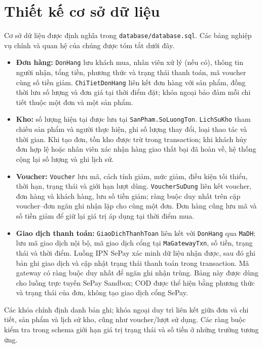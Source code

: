 \section{Thiết kế cơ sở dữ liệu}
Cơ sở dữ liệu được định nghĩa trong \texttt{database/database.sql}. Các bảng nghiệp vụ chính và quan hệ của chúng được tóm tắt dưới đây.

\begin{itemize}
    \item \textbf{Đơn hàng:} \texttt{DonHang} lưu khách mua, nhân viên xử lý (nếu có), thông tin người nhận, tổng tiền, phương thức và trạng thái thanh toán, mã voucher cùng số tiền giảm. \texttt{ChiTietDonHang} liên kết đơn hàng với sản phẩm, đồng thời lưu số lượng và đơn giá tại thời điểm đặt; khóa ngoại bảo đảm mỗi chi tiết thuộc một đơn và một sản phẩm.
    \item \textbf{Kho:} số lượng hiện tại được lưu tại \texttt{SanPham.SoLuongTon}. \texttt{LichSuKho} tham chiếu sản phẩm và người thực hiện, ghi số lượng thay đổi, loại thao tác và thời gian. Khi tạo đơn, tồn kho được trừ trong transaction; khi khách hủy đơn hợp lệ hoặc nhân viên xác nhận hàng giao thất bại đã hoàn về, hệ thống cộng lại số lượng và ghi lịch sử.
    \item \textbf{Voucher:} \texttt{Voucher} lưu mã, cách tính giảm, mức giảm, điều kiện tối thiểu, thời hạn, trạng thái và giới hạn lượt dùng. \texttt{VoucherSuDung} liên kết voucher, đơn hàng và khách hàng, lưu số tiền giảm; ràng buộc duy nhất trên cặp voucher--đơn ngăn ghi nhận lặp cho cùng một đơn. Đơn hàng cũng lưu mã và số tiền giảm để giữ lại giá trị áp dụng tại thời điểm mua.
    \item \textbf{Giao dịch thanh toán:} \texttt{GiaoDichThanhToan} liên kết với \texttt{DonHang} qua \texttt{MaDH}; lưu mã giao dịch nội bộ, mã giao dịch cổng tại \texttt{MaGatewayTxn}, số tiền, trạng thái và thời điểm. Luồng IPN SePay xác minh dữ liệu nhận được, sau đó ghi bản ghi giao dịch và cập nhật trạng thái thanh toán trong transaction. Mã gateway có ràng buộc duy nhất để ngăn ghi nhận trùng. Bảng này được dùng cho luồng trực tuyến SePay Sandbox; COD được thể hiện bằng phương thức và trạng thái của đơn, không tạo giao dịch cổng SePay.
\end{itemize}

Các khóa chính định danh bản ghi; khóa ngoại duy trì liên kết giữa đơn và chi tiết, sản phẩm và lịch sử kho, cũng như voucher/lượt sử dụng. Các ràng buộc kiểm tra trong schema giới hạn giá trị trạng thái và số tiền ở những trường tương ứng.

